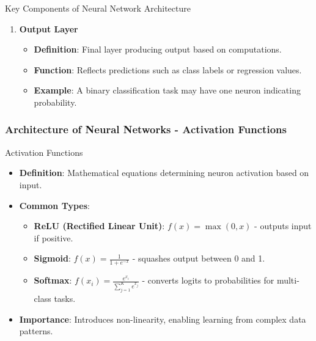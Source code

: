 \documentclass[aspectratio=169]{beamer}
\begin{document}
\begin{frame}[fragile]
\begin{block}{Key Components of Neural Network Architecture}
\begin{enumerate}
            \item \textbf{Output Layer}
                \begin{itemize}
                    \item \textbf{Definition}: Final layer producing output based on computations.
                    \item \textbf{Function}: Reflects predictions such as class labels or regression values.
                    \item \textbf{Example}: A binary classification task may have one neuron indicating probability.
                \end{itemize}
        \end{enumerate}
    \end{block}
\end{frame}

\begin{frame}[fragile]
    \frametitle{Architecture of Neural Networks - Activation Functions}
    \begin{block}{Activation Functions}
        \begin{itemize}
            \item \textbf{Definition}: Mathematical equations determining neuron activation based on input.
            \item \textbf{Common Types}:
                \begin{itemize}
                    \item \textbf{ReLU (Rectified Linear Unit)}: $f(x) = \max(0, x)$ - outputs input if positive.
                    \item \textbf{Sigmoid}: $f(x) = \frac{1}{1 + e^{-x}}$ - squashes output between 0 and 1.
                    \item \textbf{Softmax}: $f(x_i) = \frac{e^{x_i}}{\sum_{j=1}^{K} e^{x_j}}$ - converts logits to probabilities for multi-class tasks.
                \end{itemize}
            \item \textbf{Importance}: Introduces non-linearity, enabling learning from complex data patterns.
        \end{itemize}
    \end{block}
\end{frame}
\end{document}

